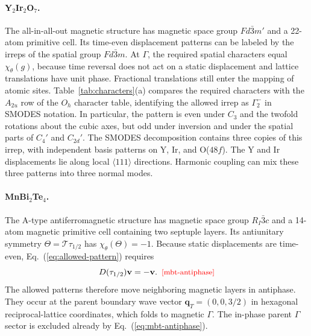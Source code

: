 \documentclass[galley,aps,pra,10pt,amsmath,amssymb,
    superscriptaddress,nofootinbib,longbibliography]{revtex4-2}
\def\Red#1{\textcolor{red}{#1}}
\newcounter{comm}
\newcommand{\eqlab}[1]{\Red{\hbox{\small\;\;[#1]}}\label{eq:#1}}
\newcommand{\eqlab}[1]{\label{eq:#1}}
\newcommand{\eq}[1]{Eq.~(\ref{eq:#1})}
\newcommand{\code}[1]{\textsc{#1}}
\newcommand{\MBT}{MnBi$_2$Te$_4$}
\newcommand{\YIO}{Y$_2$Ir$_2$O$_7$}
\begin{document}
\paragraph{\YIO{}.}
The all-in-all-out magnetic structure has magnetic space group $Fd\bar3m'$ and a 22-atom primitive cell. Its time-even displacement patterns can be labeled by the irreps of the spatial group $Fd\bar3m$. At $\Gamma$, the required spatial characters equal $\chi_\theta(g)$, because time reversal does not act on a static displacement and lattice translations have unit phase. Fractional translations still enter the mapping of atomic sites. Table~\ref{tab:characters}(a) compares the required characters with the $A_{2u}$ row of the $O_h$ character table, identifying the allowed irrep as $\Gamma_2^-$ in \code{SMODES} notation. In particular, the pattern is even under $C_3$ and the twofold rotations about the cubic axes, but odd under inversion and under the spatial parts of $C_4'$ and $C_{2d}'$. The \code{SMODES} decomposition contains three copies of this irrep, with independent basis patterns on Y, Ir, and O($48f$). The Y and Ir displacements lie along local $\langle111\rangle$ directions. Harmonic coupling can mix these three patterns into three normal modes.

\paragraph{\MBT{}.}
The A-type antiferromagnetic structure has magnetic space group $R_I\bar3c$ and a 14-atom magnetic primitive cell containing two septuple layers. Its antiunitary symmetry $\Theta=\mathcal T\tau_{1/2}$ has $\chi_\theta(\Theta)=-1$. Because static displacements are time-even, \eq{allowed-pattern} requires
\begin{equation}
D(\tau_{1/2})\mathbf v=-\mathbf v.
\eqlab{mbt-antiphase}
\end{equation}
The allowed patterns therefore move neighboring magnetic layers in antiphase. They occur at the parent boundary wave vector $\mathbf q_T=(0,0,3/2)$ in hexagonal reciprocal-lattice coordinates, which folds to magnetic $\Gamma$. The in-phase parent $\Gamma$ sector is excluded already by \eq{mbt-antiphase}.
\end{document}
